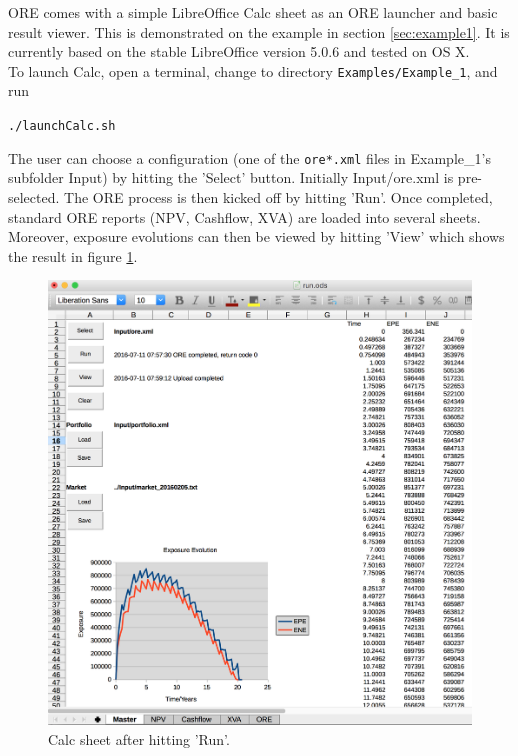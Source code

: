 \documentclass[12pt, a4paper]{article}
\begin{document}
{ORE comes with a simple LibreOffice Calc \cite{LO} sheet as an ORE launcher and basic result viewer. This is
demonstrated on the example in section \ref{sec:example1}. It is currently based on the stable LibreOffice version 5.0.6
and tested on OS X. \\

To launch Calc, open a terminal, change to directory {\tt Examples/Example\_1}, and run

\medskip
{\centerline{\tt ./launchCalc.sh} }
\medskip

The user can choose a configuration (one of the {\tt ore*.xml} files in Example\_1's subfolder Input) by hitting the
'Select' button. Initially Input/ore.xml is pre-selected. The ORE process is then kicked off by hitting 'Run'. Once
completed, standard ORE reports (NPV, Cashflow, XVA) are loaded into several sheets. Moreover, exposure evolutions can
then be viewed by hitting 'View' which shows the result in figure \ref{fig_16}.  \\
\begin{figure}[h]
\begin{center}
\includegraphics[scale=0.4]{demo_calc_2}
\end{center}
\caption{Calc sheet after hitting 'Run'.}
\label{fig_16}
\end{figure}

}
\end{document}
